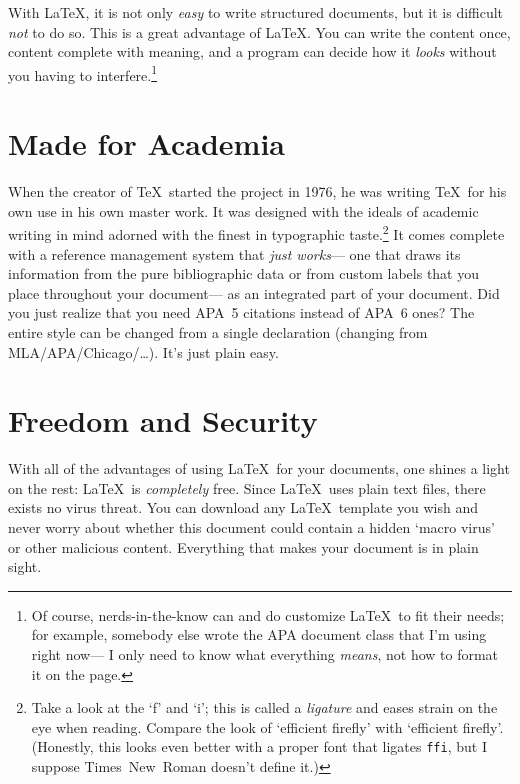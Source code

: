 \documentclass{smcm-psyc-paper}
\begin{document}
With \LaTeX, it is not only \emph{easy} to write structured documents,
  but it is difficult \emph{not} to do so.
This is a great advantage of \LaTeX.
You can write the content once,
  content complete with meaning,
  and a program can decide how it \emph{looks}
  without you having to interfere.\footnote{%
    Of course, nerds-in-the-know can and do customize \LaTeX\ to fit their needs;
    for example, somebody else wrote the APA document class that I'm using right now---%
    I only need to know what everything \emph{means},
    not how to format it on the page.}

\section{Made for Academia}
When the creator of \TeX\ started the project in 1976,
  he was writing \TeX\ for his own use in his own master work.
It was designed with the ideals of academic writing in mind
  adorned with the finest in typographic taste.\footnote{%
    Take a look at the `f' and `i';
    this is called a \textit{ligature} and eases strain on the eye when reading.
    Compare the look of `ef{}f{}icient f{}iref{}ly' with `efficient firefly'.
    (Honestly, this looks even better with a proper font that ligates \texttt{ffi},
    but I suppose Times~New~Roman doesn't define it.)}
It comes complete with a reference management system that \emph{just works}---%
  one that draws its information from the pure bibliographic data
  or from custom labels that you place throughout your document---%
  as an integrated part of your document.
Did you just realize that you need APA~5 citations instead of APA~6 ones?
The entire style can be changed from a single declaration
  (changing from MLA\slash APA\slash Chicago\slash\dots).
It's just plain easy.

\section{Freedom and Security}
With all of the advantages of using \LaTeX\ for your documents,
  one shines a light on the rest: %
  \LaTeX\ is \emph{completely} free.
Since \LaTeX\ uses plain text files,
  there exists no virus threat.
You can download any \LaTeX\ template you wish and
  never worry about whether this document
  could contain a hidden `macro virus'
  or other malicious content.
Everything that makes your document
  is in plain sight.
\end{document}

